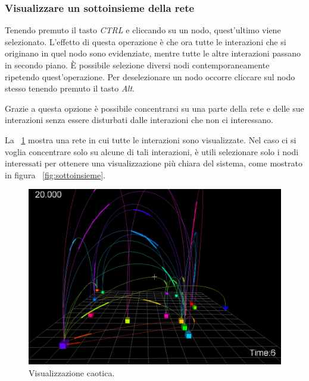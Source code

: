 \documentclass[a4paper,12pt]{article}
\begin{document}
\subsubsection{Visualizzare un sottoinsieme della rete}
Tenendo premuto il tasto \textit{CTRL} e cliccando su un nodo, quest'ultimo viene selezionato. L'effetto di questa operazione \`e che ora tutte le interazioni che si originano in quel nodo sono evidenziate, mentre tutte le altre interazioni passano in secondo piano. \`E possibile selezione diversi nodi contemporaneamente ripetendo quest'operazione. Per deselezionare un nodo occorre cliccare sul nodo stesso tenendo premuto il tasto \textit{Alt}.

Grazie a questa opzione \`e possibile concentrarsi su una parte della rete e delle sue interazioni senza essere disturbati dalle interazioni che non ci interessano.

La \figurename~\ref{fig:caotica} mostra una rete in cui tutte le interazioni sono visualizzate. Nel caso ci si voglia concentrare solo su alcune di tali interazioni, \`e utili selezionare solo i nodi interessati per ottenere una visualizzazione pi\`u chiara del sistema, come mostrato in figura \figurename~\ref{fig:sottoinsieme}.

\begin{figure}[htb!]
 \begin{center}
  \includegraphics[width=\textwidth]{images/image2.png}
 \end{center}
 \caption{Visualizzazione caotica.}
 \label{fig:caotica}
\end{figure}
 
\end{document}
